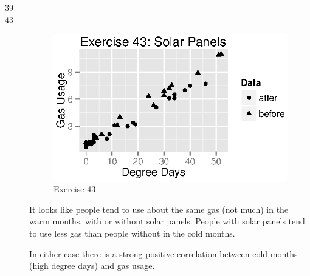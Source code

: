 \documentclass{exam}
\begin{document}
\begin{description}
      \item[39]

      \item[43]
        \begin{figure}[H]
          \centering
          \includegraphics{figures/ex43.eps}
          \caption{Exercise 43}
        \end{figure}

        It looks like people tend to use about the same gas (not much) in the warm months,
        with or without solar panels.  People with solar panels tend to use less gas than
        people without in the cold months.

        In either case there is a strong positive correlation between cold months (high
        degree days) and gas usage.


\end{description}
\end{document}
